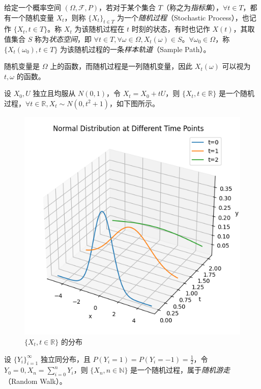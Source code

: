 \documentclass[../main.tex]{subfiles}
\begin{document}
\begin{definition*}
    给定一个概率空间 $(\Omega,\mathcal F,P)$，若对于某个集合 $T$（称之为\emph{指标集}），$\forall t\in T$，都有一个随机变量 $X_t$，则称 $\{X_t\}_{t\in T}$ 为一个\emph{随机过程}（Stochastic Process），也记作 $\{X_t,t\in T\}$。称 $X_t$ 为该随机过程在 $t$ 时刻的状态，有时也记作 $X(t)$，其取值集合 $S$ 称为\emph{状态空间}，即 $\forall t\in T,\forall \omega\in\Omega,X_t(\omega)\in S$。$\forall\omega_0\in\Omega$，称 $\{X_t(\omega_0),t\in T\}$ 为该随机过程的一条\emph{样本轨道}（Sample Path）。
\end{definition*}

随机变量是 $\Omega$ 上的函数，而随机过程是一列随机变量，因此 $X_t(\omega)$ 可以视为 $t,\omega$ 的函数。

\begin{example*}
    设 $X_0,U$ 独立且均服从 $N(0,1)$，令 $X_t=X_0+tU$，则 $\{X_t,t\in\mathbb R\}$ 是一个随机过程，$\forall t\in\mathbb R,X_t\sim N(0,t^2+1)$，如下图所示。
\end{example*}

\begin{figure}[!h]
    \centering
    \includegraphics[scale=0.7]{figures/SP_exp1.png}
    \caption*{$\{X_t,t\in\mathbb R\}$ 的分布}
\end{figure}

\begin{example*}
    设 $\{Y_i\}_{i=1}^\infty$ 独立同分布，且 $P(Y_i=1)=P(Y_i=-1)=\frac12$，令 $Y_0=0,X_n=\sum_{i=0}^nY_i$，则 $\{X_n,n\in\mathbb N\}$ 是一个随机过程，属于\emph{随机游走}（Random Walk）。
\end{example*}
\end{document}
